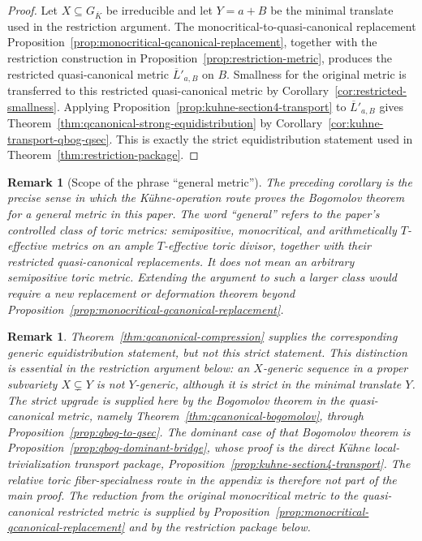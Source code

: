 \documentclass[10pt,a4paper]{amsart}
\theoremstyle{plain}
\newtheorem{remark}[theorem]{Remark}
\theoremstyle{plain}
\numberwithin{equation}{section}
\providecommand{\bL}{\overline{L}}
\begin{document}
\begin{proof}
	Let \(X\subseteq G_{\overline K}\) be irreducible and let \(Y=a+B\) be the
	minimal translate used in the restriction argument.  The
	monocritical-to-quasi-canonical replacement
	Proposition~\ref{prop:monocritical-qcanonical-replacement}, together with the
	restriction construction in Proposition~\ref{prop:restriction-metric}, produces
	the restricted quasi-canonical metric \(\bL'_{a,B}\) on \(B\).  Smallness for
	the original metric is transferred to this restricted quasi-canonical metric by
	Corollary~\ref{cor:restricted-smallness}.  Applying
	Proposition~\ref{prop:kuhne-section4-transport} to \(\bL'_{a,B}\) gives
	Theorem~\ref{thm:qcanonical-strong-equidistribution} by
	Corollary~\ref{cor:kuhne-transport-qbog-qsec}.
	This is exactly the strict equidistribution statement used in
	Theorem~\ref{thm:restriction-package}.
\end{proof}

\begin{remark}[Scope of the phrase ``general metric'']
	\label{rem:scope-general-metric}
	The preceding corollary is the precise sense in which the K\"uhne-operation
	route proves the Bogomolov theorem for a general metric in this paper.  The
	word ``general'' refers to the paper's controlled class of toric metrics:
	semipositive, monocritical, and arithmetically \(T\)-effective metrics on an
	ample \(T\)-effective toric divisor, together with their restricted
	quasi-canonical replacements.  It does not mean an arbitrary semipositive
	toric metric.  Extending the argument to such a larger class would require a
	new replacement or deformation theorem beyond
	Proposition~\ref{prop:monocritical-qcanonical-replacement}.
\end{remark}

\begin{remark}
	Theorem~\ref{thm:qcanonical-compression} supplies the corresponding generic
	equidistribution statement, but not this strict statement.  This distinction is
	essential in the restriction argument below: an \(X\)-generic sequence in a
	proper subvariety \(X\subsetneq Y\) is not \(Y\)-generic, although it is strict
	in the minimal translate \(Y\).  The strict upgrade is supplied here by the
	Bogomolov theorem in the quasi-canonical metric, namely
	Theorem~\ref{thm:qcanonical-bogomolov}, through
	Proposition~\ref{prop:qbog-to-qsec}.  The dominant case of that Bogomolov
	theorem is Proposition~\ref{prop:qbog-dominant-bridge}, whose proof is the
	direct K\"uhne local-trivialization transport package,
	Proposition~\ref{prop:kuhne-section4-transport}.  The relative toric
	fiber-specialness route in the appendix is therefore not part of the main
	proof.  The reduction from the original monocritical metric to the
	quasi-canonical restricted metric is supplied by
	Proposition~\ref{prop:monocritical-qcanonical-replacement} and by the
	restriction package below.
\end{remark}
\end{document}
